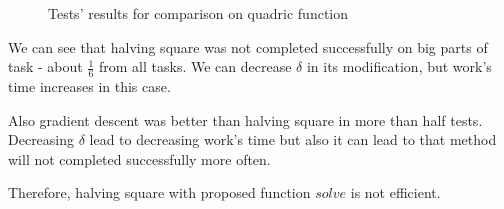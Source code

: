 \documentclass[12pt]{article}
\begin{document}
\begin{figure}[H]
\caption{Tests' results for comparison on quadric function}
\label{comp_pol}
\end{figure}

We can see that halving square was not completed successfully on big parts of task - about $\frac{1}{6}$ from all tasks. We can decrease $\delta$ in its modification, but work's time increases in this case.

Also gradient descent was better than halving square in more than half tests. Decreasing $\delta$ lead to 
decreasing work's time but also it can lead to that method will not completed successfully more often.

Therefore, halving square with proposed function $solve$ is not efficient.
\end{document}
